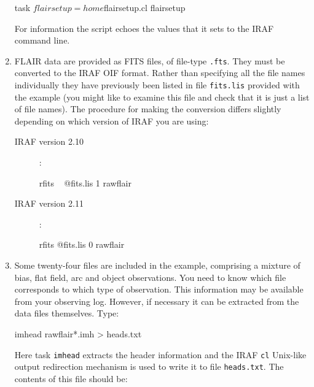 \documentclass[twoside,11pt]{starlink}
\begin{document}
\begin{enumerate}
\begin{terminalv}
task  $flairsetup=home$flairsetup.cl
flairsetup
\end{terminalv}

   For information the script echoes the values that it sets
   to the IRAF command line.

  \item FLAIR data are provided as FITS files, of file-type \texttt{.fts}.  They must be converted to the IRAF OIF format.
   Rather than specifying all the file names individually they
   have previously been listed in file \texttt{fits.lis} provided
   with the example (you might like to examine this file and
   check that it is just a list of file names).  The procedure
   for making the conversion differs slightly depending on
   which version of IRAF you are using:

  \begin{description}

    \item[IRAF version 2.10]: ~

\begin{terminalv}
rfits ~ @fits.lis  1  rawflair
\end{terminalv}

    \item[IRAF version 2.11]: ~

\begin{terminalv}
rfits  @fits.lis  0  rawflair
\end{terminalv}

  \end{description}

  \item Some twenty-four files are included in the example,
   comprising a mixture of bias, flat field, arc and object observations.
   You need to know which file corresponds to which type of
   observation.  This information may be available from your
   observing log.  However, if necessary it can be extracted
   from the data files themselves.  Type:

\begin{terminalv}
imhead  rawflair*.imh  >  heads.txt
\end{terminalv}

   Here task \texttt{imhead} extracts the header information and the IRAF \texttt{cl} Unix-like output redirection mechanism is used to write it to file
   \texttt{heads.txt}.  The contents of this file should be:


\end{enumerate}
\end{document}
